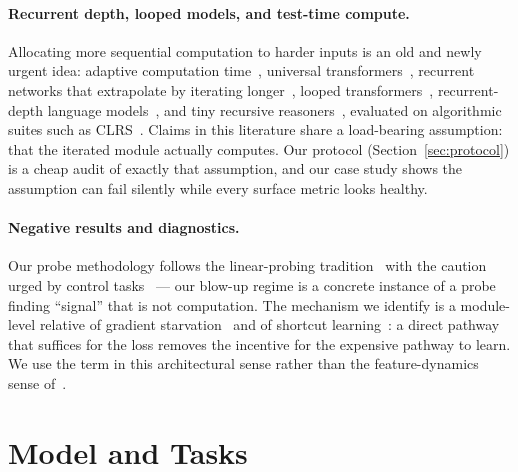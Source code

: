 \documentclass[11pt]{article}
\begin{document}
\paragraph{Recurrent depth, looped models, and test-time compute.}
Allocating more sequential computation to harder inputs is an old and
newly urgent idea: adaptive computation time~\citep{graves2016adaptive,
banino2021pondernet}, universal
transformers~\citep{dehghani2019universal}, recurrent networks that
extrapolate by iterating longer~\citep{schwarzschild2021can,
bansal2022end}, looped transformers~\citep{yang2024looped},
recurrent-depth language models~\citep{geiping2025scaling}, and tiny
recursive reasoners~\citep{wang2025hierarchical, jolicoeur2025less},
evaluated on algorithmic suites such as
CLRS~\citep{velickovic2022clrs}. Claims in this literature share a
load-bearing assumption: that the iterated module actually computes.
Our protocol (Section~\ref{sec:protocol}) is a cheap audit of exactly
that assumption, and our case study shows the assumption can fail
silently while every surface metric looks healthy.

\paragraph{Negative results and diagnostics.}
Our probe methodology follows the linear-probing
tradition~\citep{alain2017understanding} with the caution urged by
control tasks~\citep{hewitt2019designing} --- our blow-up regime is a
concrete instance of a probe finding ``signal'' that is not
computation. The mechanism we identify is a module-level relative of
gradient starvation~\citep{pezeshki2021gradient} and of shortcut
learning~\citep{geirhos2020shortcut}: a direct pathway that suffices
for the loss removes the incentive for the expensive pathway to learn.
We use the term in this architectural sense rather than the
feature-dynamics sense of~\citet{pezeshki2021gradient}.

\section{Model and Tasks}\label{sec:setup}
\end{document}

